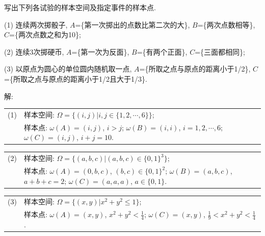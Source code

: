 \documentclass[standard]{ExBook}
\begin{document}
\begin{qitems}
    \begin{bbox}
    \begin{shaded}
        \qitem 
写出下列各试验的样本空间及指定事件的样本点.

(1) 连续两次掷骰子, $A$=\{第一次掷出的点数比第二次的大\}, $B$=\{两次点数相等\}, $C$=\{两次点数之和为10\};

(2) 连续3次掷硬币, $A$=\{第一次为反面\}, $B$=\{有两个正面\}, $C$=\{三面都相同\};

(3) 以原点为圆心的单位圆内随机取一点, $A$=\{所取之点与原点的距离小于1/2\}, $C$=\{所取之点与原点的距离小于1/2且大于1/3\}.
    \end{shaded}
    \end{bbox}

\vspace{-5em}

    \begin{bbox}
解: 

\begin{flushleft}
\begin{tabular}{ll}
(1) &样本空间: $\Omega=\{(i,j)|i,j\in\{1,2,\cdots,6\}\}$;\\
 &样本点: $\omega(A)=(i,j)$, $i>j$; $\omega(B)=(i,i)$, $i=1,2,\cdots,6$; $\omega(C)=(i,j)$, $i+j=10$.
\end{tabular}
\end{flushleft}

\begin{flushleft}
\begin{tabular}{ll}
(2) &样本空间: $\Omega=\{(a,b,c)|(a,b,c)\in\{0,1\}^3\}$;\\
 &样本点: $\omega(A)=(0,b,c)$, $(b,c)\in\{0,1\}^2$; $\omega(B)=(a,b,c)$, $a+b+c=2$; $\omega(C)=(a,a,a)$, $a\in\{0,1\}$.
\end{tabular}
\end{flushleft}

\begin{flushleft}
\begin{tabular}{ll}
(3) &样本空间: $\Omega=\{(x,y)|x^2+y^2 \leq 1\}$;\\
 &样本点: $\omega(A)=(x,y)$, $x^2+y^2 < \frac{1}{4}$; $\omega(C)=(x,y)$, $\frac{1}{9} < x^2+y^2 < \frac{1}{4}$.
\end{tabular}
\end{flushleft}
    \end{bbox}

\vspace{-5em}


\end{qitems}
\end{document}
